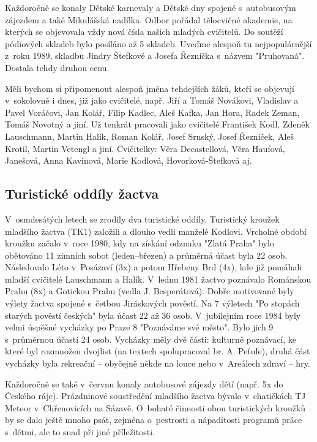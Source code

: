\documentclass[a5paper, 11pt, twoside]{article}
\begin{document}
Každoročně se konaly Dětské karnevaly a Dětské dny spojené s~autobusovým
zájezdem a také Mikulášská nadílka. Odbor pořádal tělocvičné akademie,
na kterých se objevovala vždy nová čísla našich mladých cvičitelů. Do
soutěží pódiových skladeb bylo posíláno až 5 skladeb. Uveďme alespoň tu
nejpopulárnější z~roku 1989, skladbu Jindry Štefkové a Josefa Řezníčka
s~názvem "Pruhovaná". Dostala tehdy druhou cenu.

Měli bychom si připomenout alespoň jména tehdejších žáků, kteří se
objevují v~sokolovně i dnes, již jako cvičitelé, např. Jiří a Tomáš
Novákovi, Vladislav a Pavel Voráčovi, Jan Kolář, Filip Kadlec, Aleš
Kafka, Jan Hora, Radek Zeman, Tomáš Novotný a jiní. Už tenkrát pracovali
jako cvičitelé František Kodl, Zdeněk Lauschmann, Martin Halík, Roman
Kolář, Josef Srnský, Josef Řezníček, Aleš Krotil, Martin Vetengl a jiní.
Cvičitelky: Věra Decastellová, Věra Haufová, Janešová, Anna Kavinová,
Marie Kodlová, Hovorková-Štefková aj.

\subsection{Turistické oddíly
žactva}

V~osmdesátých letech se zrodily dva turistické oddíly. Turistický
kroužek mladšího žactva (TK1) založili a dlouho vedli manželé Kodlovi.
Vrcholné období kroužku začalo v~roce 1980, kdy na získání odznaku
"Zlatá Praha" bylo obětováno 11 zimních sobot (leden--březen) a
průměrná účast byla 22 osob. Následovalo Léto v~Posázaví (3x) a potom
Hřebeny Brd (4x), kde již pomáhali mladší cvičitelé Lauschmann a Halík.
V~lednu 1981 žactvo poznávalo Románskou Prahu (8x) a Gotickou Prahu
(vedla J. Besperátová). Dobře motivované byly výlety žactva spojené
s~četbou Jiráskových pověstí. Na 7 výletech "Po stopách starých pověstí
českých" byla účast 22 až 36 osob. V~jubilejním roce 1984 byly velmi
úspěšné vycházky po Praze 8 "Poznáváme své město". Bylo jich 9
s~průměrnou účastí 24 osob. Vycházky měly dvě části: kulturně poznávací,
ke které byl rozmnožen dvojlist (na textech spolupracoval br. A.
Peťule), druhá část vycházky byla rekreační -- obyčejně někde na louce
nebo v~Areálech zdraví -- hry.

Každoročně se také v~červnu konaly autobusové zájezdy dětí (např. 5x do
Českého ráje). Prázdninové soustředění mladšího žactva bývalo
v~chatičkách TJ Meteor v~Chřenovicích na Sázavě. O~bohaté činnosti obou
turistických kroužků by se dalo ještě mnoho psát, zejména o~pestrosti a
nápaditosti programů práce s~dětmi, ale to snad při jiné příležitosti.
\end{document}
